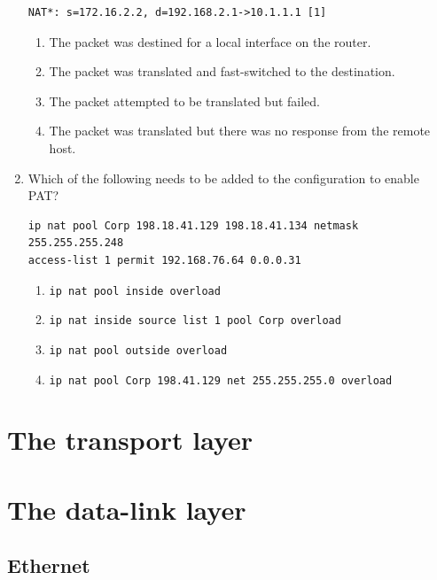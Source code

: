 \documentclass[b5paper,11pt]{memoir}
\begin{document}
\begin{enumerate}
\begin{verbatim}
NAT*: s=172.16.2.2, d=192.168.2.1->10.1.1.1 [1]
\end{verbatim}

  \begin{enumerate}
  \tightlist
  \item
    The packet was destined for a local interface on the router.
  \item
    The packet was translated and fast-switched to the destination.
  \item
    The packet attempted to be translated but failed.
  \item
    The packet was translated but there was no response from the remote
    host.
  \end{enumerate}
\item
  Which of the following needs to be added to the configuration to
  enable PAT?

\begin{verbatim}
ip nat pool Corp 198.18.41.129 198.18.41.134 netmask 255.255.255.248
access-list 1 permit 192.168.76.64 0.0.0.31
\end{verbatim}

  \begin{enumerate}
  \tightlist
  \item
    \texttt{ip\ nat\ pool\ inside\ overload}
  \item
    \texttt{ip\ nat\ inside\ source\ list\ 1\ pool\ Corp\ overload}
  \item
    \texttt{ip\ nat\ pool\ outside\ overload}
  \item
    \texttt{ip\ nat\ pool\ Corp\ 198.41.129\ net\ 255.255.255.0\ overload}
  \end{enumerate}
\end{enumerate}






\part{The transport layer}


\part{The data-link layer}

\chapter{Ethernet}
\end{document}

